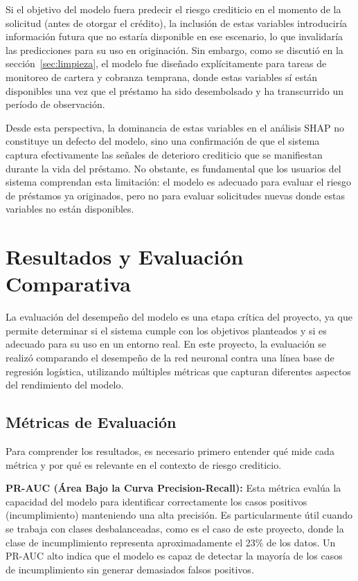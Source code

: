 \documentclass[12pt,a4paper]{article}
\begin{document}
Si el objetivo del modelo fuera predecir el riesgo crediticio en el momento de la solicitud (antes de otorgar el crédito), la inclusión de estas variables introduciría información futura que no estaría disponible en ese escenario, lo que invalidaría las predicciones para su uso en originación. Sin embargo, como se discutió en la sección~\ref{sec:limpieza}, el modelo fue diseñado explícitamente para tareas de monitoreo de cartera y cobranza temprana, donde estas variables sí están disponibles una vez que el préstamo ha sido desembolsado y ha transcurrido un período de observación.

Desde esta perspectiva, la dominancia de estas variables en el análisis SHAP no constituye un defecto del modelo, sino una confirmación de que el sistema captura efectivamente las señales de deterioro crediticio que se manifiestan durante la vida del préstamo. No obstante, es fundamental que los usuarios del sistema comprendan esta limitación: el modelo es adecuado para evaluar el riesgo de préstamos ya originados, pero no para evaluar solicitudes nuevas donde estas variables no están disponibles.

\section{Resultados y Evaluación Comparativa}
\label{sec:resultados}

La evaluación del desempeño del modelo es una etapa crítica del proyecto, ya que permite determinar si el sistema cumple con los objetivos planteados y si es adecuado para su uso en un entorno real. En este proyecto, la evaluación se realizó comparando el desempeño de la red neuronal contra una línea base de regresión logística, utilizando múltiples métricas que capturan diferentes aspectos del rendimiento del modelo.

\subsection{Métricas de Evaluación}

Para comprender los resultados, es necesario primero entender qué mide cada métrica y por qué es relevante en el contexto de riesgo crediticio.

\textbf{PR-AUC (Área Bajo la Curva Precision-Recall):} Esta métrica evalúa la capacidad del modelo para identificar correctamente los casos positivos (incumplimiento) manteniendo una alta precisión. Es particularmente útil cuando se trabaja con clases desbalanceadas, como es el caso de este proyecto, donde la clase de incumplimiento representa aproximadamente el 23\% de los datos. Un PR-AUC alto indica que el modelo es capaz de detectar la mayoría de los casos de incumplimiento sin generar demasiados falsos positivos.
\end{document}
